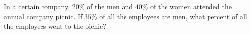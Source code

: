 In a certain company, $20\%$ of the men and $40\%$ of the women attended the annual company picnic. If $35\%$ of all the employees are men, what percent of all the employees went to the picnic?
